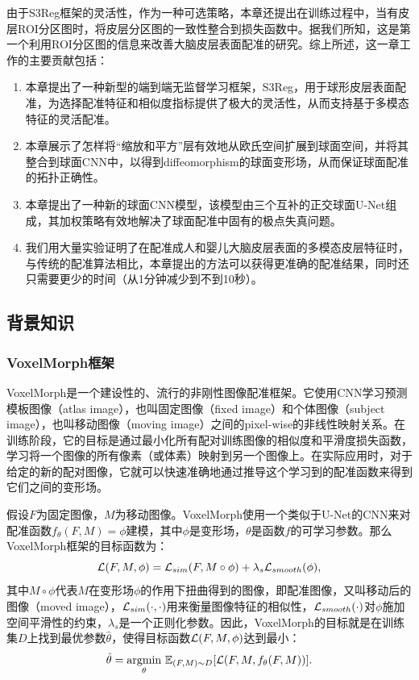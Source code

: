 由于S3Reg框架的灵活性，作为一种可选策略，本章还提出在训练过程中，当有皮层ROI分区图时，将皮层分区图的一致性整合到损失函数中。据我们所知，这是第一个利用ROI分区图的信息来改善大脑皮层表面配准的研究。综上所述，这一章工作的主要贡献包括：

\begin{enumerate}
	\item 本章提出了一种新型的端到端无监督学习框架，S3Reg，用于球形皮层表面配准，为选择配准特征和相似度指标提供了极大的灵活性，从而支持基于多模态特征的灵活配准。
	\item 本章展示了怎样将“缩放和平方”层有效地从欧氏空间扩展到球面空间，并将其整合到球面CNN中，以得到diffeomorphism的球面变形场，从而保证球面配准的拓扑正确性。
	\item 本章提出了一种新的球面CNN模型，该模型由三个互补的正交球面U-Net组成，其加权策略有效地解决了球面配准中固有的极点失真问题。
	\item 我们用大量实验证明了在配准成人和婴儿大脑皮层表面的多模态皮层特征时，与传统的配准算法相比，本章提出的方法可以获得更准确的配准结果，同时还只需要更少的时间（从1分钟减少到不到10秒）。
\end{enumerate}

\subsection{背景知识}
\subsubsection{VoxelMorph框架}
VoxelMorph\cite{balakrishnan2018unsupervised}是一个建设性的、流行的非刚性图像配准框架。它使用CNN学习预测模板图像（atlas image），也叫固定图像（fixed image）和个体图像（subject image），也叫移动图像（moving image）之间的pixel-wise的非线性映射关系。在训练阶段，它的目标是通过最小化所有配对训练图像的相似度和平滑度损失函数，学习将一个图像的所有像素（或体素）映射到另一个图像上。在实际应用时，对于给定的新的配对图像，它就可以快速准确地通过推导这个学习到的配准函数来得到它们之间的变形场。

假设$F$为固定图像，$M$为移动图像。VoxelMorph使用一个类似于U-Net的CNN来对配准函数$f_{\theta}(F,M)=\phi$建模，其中$\phi$是变形场，$\theta$是函数$f$的可学习参数。那么VoxelMorph框架的目标函数为：
\begin{equation}\label{eq:3-1}
{\cal L}(F,M,\phi)={\cal L}_{sim}(F,M\circ{\phi})+\lambda_s{{\cal L}_{smooth}(\phi)},
\end{equation}
其中$M\circ\phi$代表$M$在变形场$\phi$的作用下扭曲得到的图像，即配准图像，又叫移动后的图像（moved image），${\cal L}_{sim}(\cdot,\cdot)$用来衡量图像特征的相似性，${\cal L}_{smooth}(\cdot)$对$\phi$施加空间平滑性的约束，$\lambda_s$是一个正则化参数。因此，VoxelMorph的目标就是在训练集$D$上找到最优参数$\hat{\theta}$，使得目标函数${\cal L}(F,M,\phi)$达到最小：
\begin{equation}
\hat{\theta}=\underset{\theta}{\mathrm{argmin}}~\mathbb{E}_{(F,M)\sim D}[{\cal L}(F,M,f_{\theta}(F,M))].
\end{equation}

